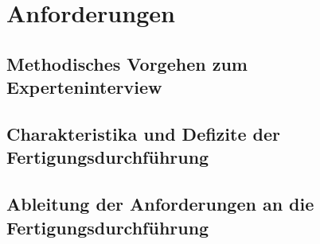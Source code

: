 \section{Anforderungen}

\subsection{Methodisches Vorgehen zum Experteninterview}

\subsection{Charakteristika und Defizite der Fertigungsdurchführung}

\subsection{Ableitung der Anforderungen an die Fertigungsdurchführung}